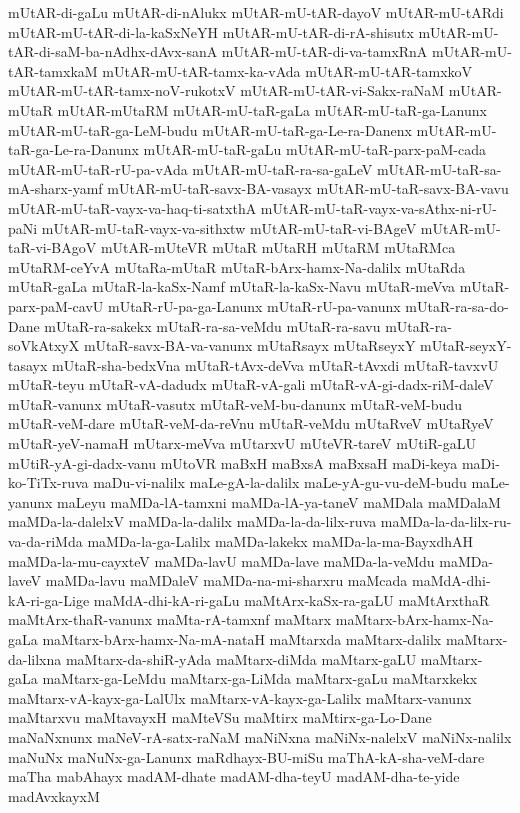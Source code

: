 {mUtAR-di-gaLu
mUtAR-di-nAlukx
mUtAR-mU-tAR-dayoV
mUtAR-mU-tARdi
mUtAR-mU-tAR-di-la-kaSxNeYH
mUtAR-mU-tAR-di-rA-shisutx
mUtAR-mU-tAR-di-saM-ba-nAdhx-dAvx-sanA
mUtAR-mU-tAR-di-va-tamxRnA
mUtAR-mU-tAR-tamxkaM
mUtAR-mU-tAR-tamx-ka-vAda
mUtAR-mU-tAR-tamxkoV
mUtAR-mU-tAR-tamx-noV-rukotxV
mUtAR-mU-tAR-vi-Sakx-raNaM
mUtAR-mUtaR
mUtAR-mUtaRM
mUtAR-mU-taR-gaLa
mUtAR-mU-taR-ga-Lanunx
mUtAR-mU-taR-ga-LeM-budu
mUtAR-mU-taR-ga-Le-ra-Danenx
mUtAR-mU-taR-ga-Le-ra-Danunx
mUtAR-mU-taR-gaLu
mUtAR-mU-taR-parx-paM-cada
mUtAR-mU-taR-rU-pa-vAda
mUtAR-mU-taR-ra-sa-gaLeV
mUtAR-mU-taR-sa-mA-sharx-yamf
mUtAR-mU-taR-savx-BA-vasayx
mUtAR-mU-taR-savx-BA-vavu
mUtAR-mU-taR-vayx-va-haq-ti-satxthA
mUtAR-mU-taR-vayx-va-sAthx-ni-rU-paNi
mUtAR-mU-taR-vayx-va-sithxtw
mUtAR-mU-taR-vi-BAgeV
mUtAR-mU-taR-vi-BAgoV
mUtAR-mUteVR
mUtaR
mUtaRH
mUtaRM
mUtaRMca
mUtaRM-ceYvA
mUtaRa-mUtaR
mUtaR-bArx-hamx-Na-dalilx
mUtaRda
mUtaR-gaLa
mUtaR-la-kaSx-Namf
mUtaR-la-kaSx-Navu
mUtaR-meVva
mUtaR-parx-paM-cavU
mUtaR-rU-pa-ga-Lanunx
mUtaR-rU-pa-vanunx
mUtaR-ra-sa-do-Dane
mUtaR-ra-sakekx
mUtaR-ra-sa-veMdu
mUtaR-ra-savu
mUtaR-ra-soVkAtxyX
mUtaR-savx-BA-va-vanunx
mUtaRsayx
mUtaRseyxY
mUtaR-seyxY-tasayx
mUtaR-sha-bedxVna
mUtaR-tAvx-deVva
mUtaR-tAvxdi
mUtaR-tavxvU
mUtaR-teyu
mUtaR-vA-dadudx
mUtaR-vA-gali
mUtaR-vA-gi-dadx-riM-daleV
mUtaR-vanunx
mUtaR-vasutx
mUtaR-veM-bu-danunx
mUtaR-veM-budu
mUtaR-veM-dare
mUtaR-veM-da-reVnu
mUtaR-veMdu
mUtaRveV
mUtaRyeV
mUtaR-yeV-namaH
mUtarx-meVva
mUtarxvU
mUteVR-tareV
mUtiR-gaLU
mUtiR-yA-gi-dadx-vanu
mUtoVR
maBxH
maBxsA
maBxsaH
maDi-keya
maDi-ko-TiTx-ruva
maDu-vi-nalilx
maLe-gA-la-dalilx
maLe-yA-gu-vu-deM-budu
maLe-yanunx
maLeyu
maMDa-lA-tamxni
maMDa-lA-ya-taneV
maMDala
maMDalaM
maMDa-la-dalelxV
maMDa-la-dalilx
maMDa-la-da-lilx-ruva
maMDa-la-da-lilx-ru-va-da-riMda
maMDa-la-ga-Lalilx
maMDa-lakekx
maMDa-la-ma-BayxdhAH
maMDa-la-mu-cayxteV
maMDa-lavU
maMDa-lave
maMDa-la-veMdu
maMDa-laveV
maMDa-lavu
maMDaleV
maMDa-na-mi-sharxru
maMcada
maMdA-dhi-kA-ri-ga-Lige
maMdA-dhi-kA-ri-gaLu
maMtArx-kaSx-ra-gaLU
maMtArxthaR
maMtArx-thaR-vanunx
maMta-rA-tamxnf
maMtarx
maMtarx-bArx-hamx-Na-gaLa
maMtarx-bArx-hamx-Na-mA-nataH
maMtarxda
maMtarx-dalilx
maMtarx-da-lilxna
maMtarx-da-shiR-yAda
maMtarx-diMda
maMtarx-gaLU
maMtarx-gaLa
maMtarx-ga-LeMdu
maMtarx-ga-LiMda
maMtarx-gaLu
maMtarxkekx
maMtarx-vA-kayx-ga-LalUlx
maMtarx-vA-kayx-ga-Lalilx
maMtarx-vanunx
maMtarxvu
maMtavayxH
maMteVSu
maMtirx
maMtirx-ga-Lo-Dane
maNaNxnunx
maNeV-rA-satx-raNaM
maNiNxna
maNiNx-nalelxV
maNiNx-nalilx
maNuNx
maNuNx-ga-Lanunx
maRdhayx-BU-miSu
maThA-kA-sha-veM-dare
maTha
mabAhayx
madAM-dhate
madAM-dha-teyU
madAM-dha-te-yide
madAvxkayxM
}
